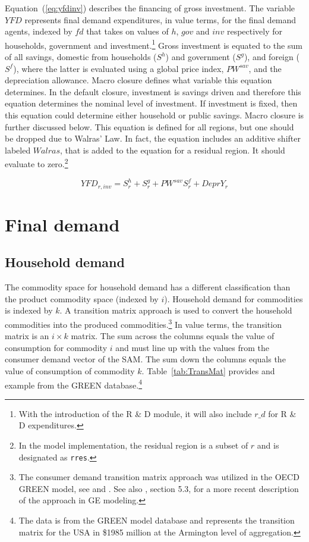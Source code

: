 \documentclass[11pt,letterpaper]{report}
\begin{document}
Equation~(\ref{eq:yfdinv}) describes the financing of gross investment. The
variable $\mathit{YFD}$ represents final demand expenditures, in value terms,
for the final demand agents, indexed by $\mathit{fd}$ that takes on values of
$\mathit{h}$, $\mathit{gov}$ and $\mathit{inv}$ respectively for households,
government and investment.\footnote{With the introduction of the R \& D module, it will also include $r\_d$ for R \& D expenditures.} Gross investment is equated to the sum of all
savings, domestic from households ($\mathit{S^h}$) and government
($\mathit{S^g}$), and foreign ($\mathit{S^f}$), where the latter is evaluated
using a global price index, $\mathit{PW^{sav}}$, and the depreciation allowance.
Macro closure defines what variable this equation determines. In the default
closure, investment is savings driven and therefore this equation determines the
nominal level of investment. If investment is fixed, then this equation could
determine either household or public savings. Macro closure is further discussed
below. This equation is defined for all regions, but one should be
dropped due to Walras' Law. In fact, the equation includes an
additive shifter labeled $\mathit{Walras}$, that is added to
the equation for a residual region. It should evaluate to
zero.\footnote{In the model implementation, the residual region is a
subset of $r$ and is designated as \texttt{rres}.}

\begin{equation}
\label{eq:yfdinv}
\mathit{YFD}_{r,inv} = S^h_r + S^g_r
   + \mathit{PW}^{\mathit{sav}} S^f_r + \mathit{DeprY_r}
\end{equation}

\section{Final demand}
\renewcommand{\theequation}{{D-}\arabic{equation}}
\setcounter{equation}{0}

\subsection{Household demand}

The commodity space for household demand has a different classification than the
product commodity space (indexed by $i$). Household demand for commodities is
indexed by $k$. A transition matrix approach is used to convert the household
commodities into the produced commodities.\footnote{The consumer demand
transition matrix approach was utilized in the OECD GREEN model, see
\cite{Burniauxetal1992} and \cite{GREENDvdM1994}. See also
\cite{Cardeneteetal2012}, section 5.3, for a more recent description of the
approach in GE modeling.} In value terms, the transition matrix is an
$i \times k$ matrix. The sum across the columns equals the value of consumption
for commodity $i$ and must line up with the values from the consumer demand
vector of the SAM. The sum down the columns equals the value of consumption of
commodity $k$. Table~\ref{tab:TransMat} provides and example from the GREEN
database.\footnote{The data is from the GREEN model database and represents the
transition matrix for the USA in \$1985 million at the Armington level of
aggregation.}
\end{document}

